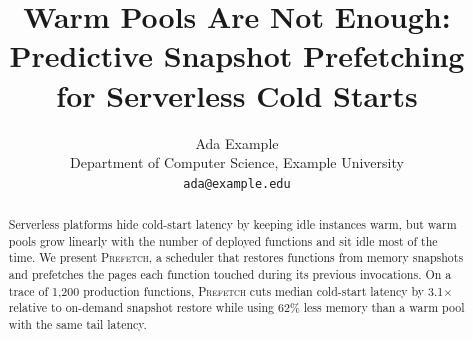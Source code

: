 \documentclass[11pt]{article}
\title{Warm Pools Are Not Enough:\\Predictive Snapshot Prefetching for Serverless Cold Starts}
\author{Ada Example\\
  Department of Computer Science, Example University\\
  \texttt{ada@example.edu}}
\date{}
\begin{document}
\maketitle

\begin{abstract}
Serverless platforms hide cold-start latency by keeping idle instances warm, but
warm pools grow linearly with the number of deployed functions and sit idle most
of the time. We present \textsc{Prefetch}, a scheduler that restores functions
from memory snapshots and prefetches the pages each function touched during its
previous invocations. On a trace of 1{,}200 production functions, \textsc{Prefetch}
cuts median cold-start latency by 3.1$\times$ relative to on-demand snapshot
restore while using 62\% less memory than a warm pool with the same tail latency.
\end{abstract}








\end{document}

